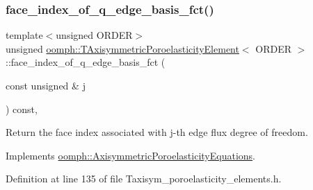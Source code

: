 \subsubsection{\texorpdfstring{face\+\_\+index\+\_\+of\+\_\+q\+\_\+edge\+\_\+basis\+\_\+fct()}{face\_index\_of\_q\_edge\_basis\_fct()}}
{\footnotesize\ttfamily template$<$unsigned O\+R\+D\+ER$>$ \\
unsigned \hyperlink{classoomph_1_1TAxisymmetricPoroelasticityElement}{oomph\+::\+T\+Axisymmetric\+Poroelasticity\+Element}$<$ O\+R\+D\+ER $>$\+::face\+\_\+index\+\_\+of\+\_\+q\+\_\+edge\+\_\+basis\+\_\+fct (\begin{DoxyParamCaption}\item[{const unsigned \&}]{j }\end{DoxyParamCaption}) const\hspace{0.3cm}{\ttfamily [inline]}, {\ttfamily [virtual]}}



Return the face index associated with j-\/th edge flux degree of freedom. 



Implements \hyperlink{classoomph_1_1AxisymmetricPoroelasticityEquations_a69ee55cdbcfc2db8593ff8f6ea8fd58d}{oomph\+::\+Axisymmetric\+Poroelasticity\+Equations}.



Definition at line 135 of file Taxisym\+\_\+poroelasticity\+\_\+elements.\+h.

\mbox{\label{classoomph_1_1TAxisymmetricPoroelasticityElement_affd83cf08ab80d7888634ff2c1f58c76}} 

